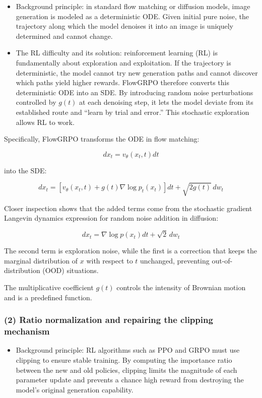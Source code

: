 \begin{itemize}
\tightlist
\item
  Background principle: in standard flow matching or diffusion models, image generation is modeled as a deterministic ODE. Given initial pure noise, the trajectory along which the model denoises it into an image is uniquely determined and cannot change.
\item
  The RL difficulty and its solution: reinforcement learning (RL) is fundamentally about exploration and exploitation. If the trajectory is deterministic, the model cannot try new generation paths and cannot discover which paths yield higher rewards. FlowGRPO therefore converts this deterministic ODE into an SDE. By introducing random noise perturbations controlled by \(g(t)\) at each denoising step, it lets the model deviate from its established route and ``learn by trial and error.'' This stochastic exploration allows RL to work.
\end{itemize}

Specifically, FlowGRPO transforms the ODE in flow matching:

\[
dx_t=v_\theta(x_t,t)dt
\]

into the SDE:

\[
dx_t=\left[v_\theta(x_t,t)+g(t)\nabla\log p_t(x_t)\right]dt+\sqrt{2g(t)}\,dw_t
\]

Closer inspection shows that the added terms come from the stochastic gradient Langevin dynamics expression for random noise addition in diffusion:

\[
dx_t=\nabla\log p(x_t)dt+\sqrt{2}\,dw_t
\]

The second term is exploration noise, while the first is a correction that keeps the marginal distribution of \(x\) with respect to \(t\) unchanged, preventing out-of-distribution (OOD) situations.

The multiplicative coefficient \(g(t)\) controls the intensity of Brownian motion and is a predefined function.

\hypertarget{ratio-normalization-and-repairing-the-clipping-mechanism}{%
\subsubsection{(2) Ratio normalization and repairing the clipping mechanism}\label{ratio-normalization-and-repairing-the-clipping-mechanism}}

\begin{itemize}
\tightlist
\item
  Background principle: RL algorithms such as PPO and GRPO must use clipping to ensure stable training. By computing the importance ratio between the new and old policies, clipping limits the magnitude of each parameter update and prevents a chance high reward from destroying the model's original generation capability.
\end{itemize}

